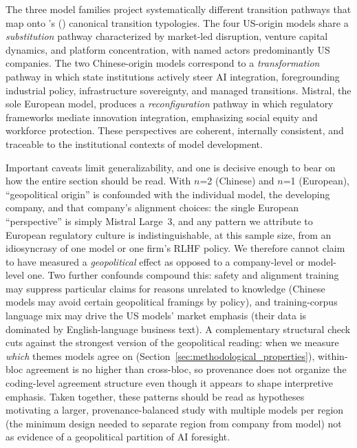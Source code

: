 \documentclass[preprint,review,12pt]{elsarticle}
\begin{document}
The three model families project systematically different transition pathways that map onto \citeauthor{geels2005coevolutionary}'s (\citeyear{geels2005coevolutionary}) canonical transition typologies. The four US-origin models share a \textit{substitution} pathway characterized by market-led disruption, venture capital dynamics, and platform concentration, with named actors predominantly US companies. The two Chinese-origin models correspond to a \textit{transformation} pathway in which state institutions actively steer AI integration, foregrounding industrial policy, infrastructure sovereignty, and managed transitions. Mistral, the sole European model, produces a \textit{reconfiguration} pathway in which regulatory frameworks mediate innovation integration, emphasizing social equity and workforce protection. These perspectives are coherent, internally consistent, and traceable to the institutional contexts of model development.

Important caveats limit generalizability, and one is decisive enough to bear on how the entire section should be read. With $n$=2 (Chinese) and $n$=1 (European), ``geopolitical origin'' is confounded with the individual model, the developing company, and that company's alignment choices: the single European ``perspective'' is simply Mistral Large~3, and any pattern we attribute to European regulatory culture is indistinguishable, at this sample size, from an idiosyncrasy of one model or one firm's RLHF policy. We therefore cannot claim to have measured a \emph{geopolitical} effect as opposed to a company-level or model-level one. Two further confounds compound this: safety and alignment training may suppress particular claims for reasons unrelated to knowledge (Chinese models may avoid certain geopolitical framings by policy), and training-corpus language mix may drive the US models' market emphasis (their data is dominated by English-language business text). A complementary structural check cuts against the strongest version of the geopolitical reading: when we measure \emph{which} themes models agree on (Section~\ref{sec:methodological_properties}), within-bloc agreement is no higher than cross-bloc, so provenance does not organize the coding-level agreement structure even though it appears to shape interpretive emphasis. Taken together, these patterns should be read as hypotheses motivating a larger, provenance-balanced study with multiple models per region (the minimum design needed to separate region from company from model) not as evidence of a geopolitical partition of AI foresight.
\end{document}
